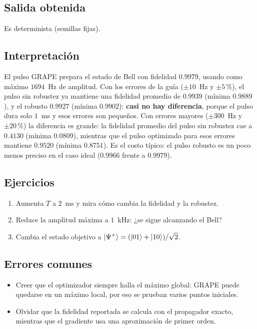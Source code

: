 \subsection{Salida obtenida}

Es determinista (semillas fijas).

\subsection{Interpretación}
El pulso GRAPE prepara el estado de Bell con fidelidad $0.9979$, usando como
máximo $1694$~Hz de amplitud. Con los errores de la guía ($\pm10$~Hz y
$\pm5$\,\%), el pulso sin robustez ya mantiene una fidelidad promedio de
$0.9939$ (mínima $0.9889$), y el robusto $0.9927$ (mínima $0.9902$):
\textbf{casi no hay diferencia}, porque el pulso dura solo $1$~ms y esos errores
son pequeños. Con errores mayores ($\pm300$~Hz y $\pm20$\,\%) la diferencia es
grande: la fidelidad promedio del pulso sin robustez cae a $0.4130$ (mínima
$0.0809$), mientras que el pulso optimizado para esos errores mantiene $0.9520$
(mínima $0.8751$). Es el costo típico: el pulso robusto es un poco menos preciso
en el caso ideal ($0.9966$ frente a $0.9979$).

\subsection{Ejercicios}
\begin{enumerate}
  \item Aumenta $T$ a $2$~ms y mira cómo cambia la fidelidad y la robustez.
  \item Reduce la amplitud máxima a $1$~kHz: ¿se sigue alcanzando el Bell?
  \item Cambia el estado objetivo a $\left|\Psi^+\right\rangle=(\left|01\right\rangle+\left|10\right\rangle)/\sqrt2$.
\end{enumerate}

\subsection{Errores comunes}
\begin{itemize}
  \item Creer que el optimizador siempre halla el máximo global: GRAPE puede
    quedarse en un máximo local, por eso se prueban varios puntos iniciales.
  \item Olvidar que la fidelidad reportada se calcula con el propagador exacto,
    mientras que el gradiente usa una aproximación de primer orden.
\end{itemize}


